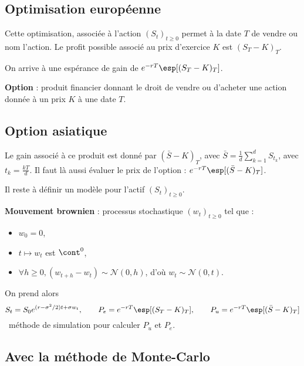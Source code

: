 \subsection{Optimisation européenne}

	Cette optimisation, associée à l'action $(S_t)_{t \geq 0}$ permet à la date $T$ de vendre ou nom l'action.
	Le profit possible associé au prix d'exercice $K$ est $(S_T - K)_T$.
	
	On arrive à une espérance de gain de $e^{-rT} \esp[(S_T - K)_T]$.
	
	\begin{defn}
		\textbf{Option} : produit financier donnant le droit de vendre  ou d'acheter une action donnée à un prix $K$ à une date $T$.
	\end{defn}


\subsection{Option asiatique}

	Le gain associé à ce produit est donné par $(\bar{S} - K)_T$, avec $\bar{S} = \frac{1}{d} \sum_{k = 1}^d S_{t_k}$, avec $t_k = \frac{kT}{d}$.
	Il faut là aussi évaluer le prix de l'option : $e^{-rT} \esp[(\bar{S} - K)_T]$.
	
	
	Il reste à définir un modèle pour l'actif $(S_t)_{t \geq 0}$.
	
	\begin{defn}
		\textbf{Mouvement brownien} : processus stochastique $(w_t)_{t \geq 0}$ tel que :
		\begin{itemize}
			\item[\textbullet] $w_0 = 0$,
			\item[\textbullet] $t \mapsto w_t$ est $\cont^0$,
			\item[\textbullet] $\forall h \geq 0, (w_{t + h} - w_t) \sim \mathcal{N}(0,h)$, d'où $w_t \sim \mathcal{N}(0,t)$.
		\end{itemize}
	\end{defn}
	
	On prend alors
	$$S_t = S_0 e^{(r - \sigma^2/2)t + \sigma w_t}, \qquad P_e = e^{-rT} \esp[(S_T - K)_T], \qquad P_u = e^{-rT} \esp[(\bar{S} - K)_T]$$
	\textrightarrow\ méthode de simulation pour calculer $P_u$ et $P_e$.


\subsection{Avec la méthode de Monte-Carlo}

